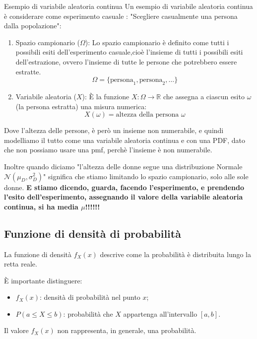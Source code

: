 \begin{example}{Esempio di variabile aleatoria continua}
    Un esempio di variabile aleatoria continua è considerare come esperimento casuale : "Scegliere casualmente una persona dalla popolazione":
    \begin{enumerate}
        \item Spazio campionario ($\Omega$): Lo spazio campionario è definito come tutti i possibili esiti dell'esperimento casuale,cioè l'insieme di tutti i possibili esiti dell'estrazione, ovvero l'insieme di tutte le persone che potrebbero essere estratte.
        $$\Omega = \{\text{persona}_1, \text{persona}_2, \dots\}$$
        \item Variabile aleatoria ($X$): È la funzione $X: \Omega \to \mathbb{R}$ che assegna a ciascun esito $\omega$ (la persona estratta) una misura numerica:$$X(\omega) = \text{altezza della persona } \omega$$
    \end{enumerate}
    Dove l'altezza delle persone, è però un insieme non numerabile, e quindi modelliamo il tutto come una variabile aleatoria continua e con una PDF, dato che non possiamo usare una pmf, perchè l'insieme è non numerabile.

    Inoltre quando diciamo "l'altezza delle donne segue una distribuzione Normale $\mathcal{N}(\mu_D, \sigma_D^2)$" significa che stiamo limitando lo spazio campionario, solo alle sole donne.
    \textbf{E stiamo dicendo, guarda, facendo l'esperimento, e prendendo l'esito dell'esperimento, assegnando il valore della variabile aleatoria continua, si ha media $\mu$!!!!!!}
\end{example}

\subsection{Funzione di densità di probabilità}

La funzione di densità $f_X(x)$ descrive
come la probabilità è distribuita
lungo la retta reale.

È importante distinguere:
\begin{itemize}
    \item $f_X(x)$: densità di probabilità
    nel punto $x$;
    \item $P(a\leq X\leq b)$: probabilità
    che $X$ appartenga all'intervallo $[a,b]$.
\end{itemize}

Il valore $f_X(x)$ non rappresenta,
in generale, una probabilità.


